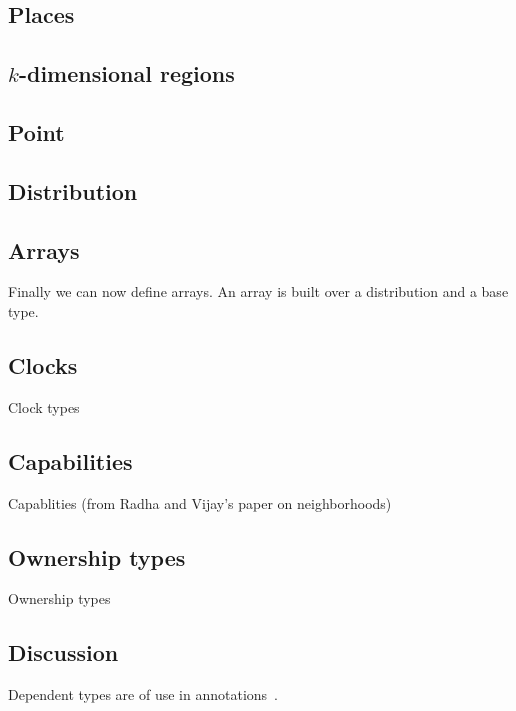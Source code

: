 \subsection{Places}

\begin{figure}

\end{figure}

\subsection{$k$-dimensional regions}

\begin{figure}

\end{figure}

\subsection{Point}

\begin{figure}

\end{figure}

\subsection{Distribution}

\begin{figure}

\end{figure}

\subsection{Arrays}

\cite{gps06-arrays}

Finally we can now define arrays. An array is built over a
distribution and a base type.

\begin{figure}

\end{figure}

\subsection{Clocks}

Clock types

\subsection{Capabilities}

Capablities (from Radha and Vijay's paper on neighborhoods)

\subsection{Ownership types}

Ownership types~\cite{ownership-types}

\subsection{Discussion}

Dependent types are of use in annotations~\cite{ns07-x10anno}.
